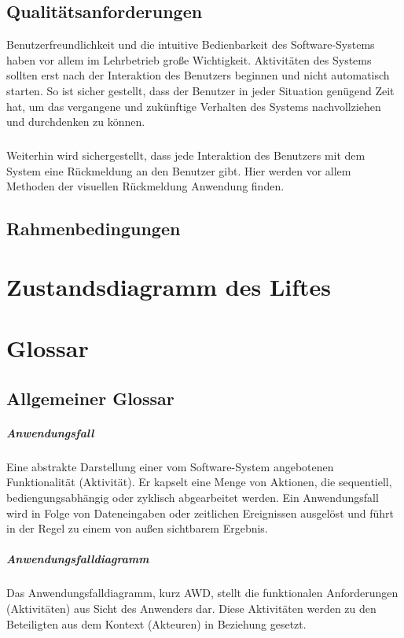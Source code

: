 \section{Qualitätsanforderungen}
Benutzerfreundlichkeit und die intuitive Bedienbarkeit des Software-Systems haben vor allem im Lehrbetrieb große Wichtigkeit. Aktivitäten des Systems sollten erst nach der Interaktion des Benutzers beginnen und nicht automatisch starten. So ist sicher gestellt, dass der Benutzer in jeder Situation genügend Zeit hat, um das vergangene und zukünftige Verhalten des Systems nachvollziehen und durchdenken zu können. 

\paragraph{}
Weiterhin wird sichergestellt, dass jede Interaktion des Benutzers mit dem System eine Rückmeldung an den Benutzer gibt. Hier werden vor allem Methoden der visuellen Rückmeldung Anwendung finden.

\section{Rahmenbedingungen}

\chapter{Zustandsdiagramm des Liftes}

\chapter{Glossar}

\section{Allgemeiner Glossar}
\paragraph{Anwendungsfall}
Eine abstrakte Darstellung einer vom Software-System angebotenen Funktionalität (Aktivität). Er kapselt eine Menge von Aktionen, die sequentiell, bediengungsabhängig oder zyklisch abgearbeitet werden. Ein Anwendungsfall wird in Folge von Dateneingaben oder zeitlichen Ereignissen ausgelöst und führt in der Regel zu einem von au{\ss}en sichtbarem Ergebnis.

\paragraph{Anwendungsfalldiagramm}
Das Anwendungsfalldiagramm, kurz AWD, stellt die funktionalen Anforderungen (Aktivitäten) aus Sicht des Anwenders dar. Diese Aktivitäten werden zu den Beteiligten aus dem Kontext (Akteuren) in Beziehung gesetzt.


